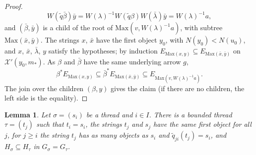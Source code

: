 \documentclass[11pt]{amsart}
\newtheorem{lem}[thm]{Lemma}
\theoremstyle{definition}
\newcommand{\Max}{\mathrm{Max}}
\newcommand{\cX}{\mathcal X}
\begin{document}
\begin{proof}
\[
W(\tilde q\bar\beta)\bar y=W(\lambda)^{-1}W(\tilde
q\beta)W(\bar\lambda)\bar y=W(\lambda)^{-1}a,
\]
and $(\bar\beta,\bar y)$ is a child of the root of
$\Max(v,W(\lambda)^{-1}a)$, with subtree $\Max(\bar x,\bar y)$. The
strings $x$, $\bar x$ have the first object $y_0$, with
$N(y_0)<N(u_0)$, and $x$, $\bar x$, $\bar\lambda$, $y$ satisfy the
hypotheses; by induction $E_{\Max(x,y)}\subseteq E_{\Max(\bar x,\bar
y)}$ on $\cX'(y_0,m_*)$. As $\beta$ and $\bar\beta$ have the same
underlying arrow $g$,
\[
\beta^*E_{\Max(x,y)}\subseteq\bar\beta^*E_{\Max(\bar x,\bar
y)}\subseteq E_{\Max(v,W(\lambda)^{-1}a)} .
\]
The join over the children $(\beta,y)$ gives the claim (if there are
no children, the left side is the equality).
\end{proof}

\begin{lem}\label{lem:sub}
Let $\sigma=(s_i)$ be a thread and $i\in I$. There is a bounded thread
$\tau=(t_j)$ such that $t_i=s_i$, the strings $t_j$ and $s_j$ have the
same first object for all $j$, for $j\ge i$ the string $t_j$ has as
many objects as $s_i$ and $\tilde q_{ji}(t_j)=s_i$, and
$H_\sigma\subseteq H_\tau$ in $G_\sigma=G_\tau$.
\end{lem}
\end{document}
